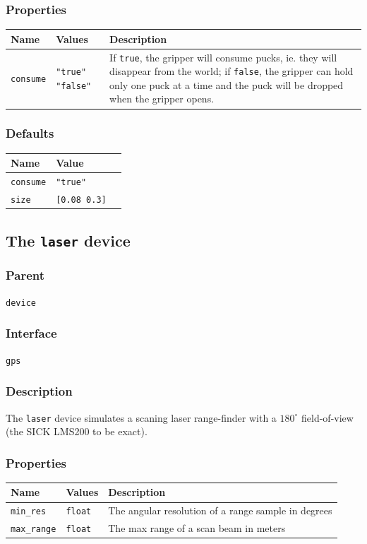 \documentclass[11pt,twoside]{report}
\begin{document}
\subsubsection*{Properties}
\begin{tabularx}{\columnwidth}{llX}
\hline
Name & Values & Description \\
\hline
\verb'consume' &  \verb'"true"' \verb'"false"' & If {\tt true}, the
gripper will consume pucks, ie. they will disappear from the world; if {\tt false}, the gripper can hold only
one puck at a time and the puck will be dropped when the gripper opens.\\
\hline
\end{tabularx}

\subsubsection*{Defaults}
\begin{tabularx}{\columnwidth}{llX}
\hline
Name & Value\\
\hline
\verb'consume' & \verb'"true"' \\
\verb'size' & \verb'[0.08 0.3]'\\
\hline
\end{tabularx}

\newpage
\subsection{The {\tt laser} device}

\subsubsection*{Parent}
{\tt device}

\subsubsection*{Interface}
{\tt gps}

\subsubsection*{Description}
The {\tt laser} device simulates a scaning laser range-finder with a
$180^\circ$ field-of-view (the SICK LMS200 to be exact).

\subsubsection*{Properties}
\begin{tabularx}{\columnwidth}{llX}
\hline
Name & Values & Description \\
\hline
\verb'min_res' & \verb'float' & 
The angular resolution of a range sample in degrees\\
\verb'max_range' & \verb'float' & The max range of a scan beam in meters\\
\hline
\end{tabularx}
\end{document}

